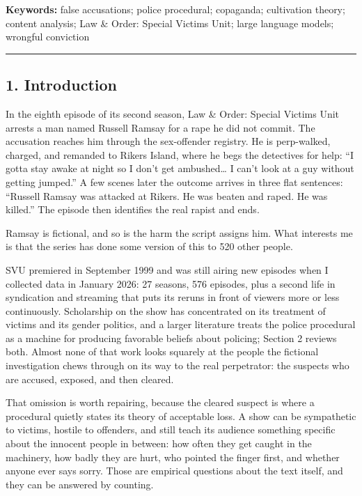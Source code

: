 \documentclass[
]{article}
\newcounter{none} %
\begin{document}
\textbf{Keywords:} false accusations; police procedural; copaganda;
cultivation theory; content analysis; Law \& Order: Special Victims
Unit; large language models; wrongful conviction

\begin{center}\rule{0.5\linewidth}{0.5pt}\end{center}

\subsection{1. Introduction}\label{introduction}

In the eighth episode of its second season, Law \& Order: Special
Victims Unit arrests a man named Russell Ramsay for a rape he did not
commit. The accusation reaches him through the sex-offender registry. He
is perp-walked, charged, and remanded to Rikers Island, where he begs
the detectives for help: ``I gotta stay awake at night so I don't get
ambushed\ldots{} I can't look at a guy without getting jumped.'' A few
scenes later the outcome arrives in three flat sentences: ``Russell
Ramsay was attacked at Rikers. He was beaten and raped. He was killed.''
The episode then identifies the real rapist and ends.

Ramsay is fictional, and so is the harm the script assigns him. What
interests me is that the series has done some version of this to 520
other people.

SVU premiered in September 1999 and was still airing new episodes when I
collected data in January 2026: 27 seasons, 576 episodes, plus a second
life in syndication and streaming that puts its reruns in front of
viewers more or less continuously. Scholarship on the show has
concentrated on its treatment of victims and its gender politics, and a
larger literature treats the police procedural as a machine for
producing favorable beliefs about policing; Section 2 reviews both.
Almost none of that work looks squarely at the people the fictional
investigation chews through on its way to the real perpetrator: the
suspects who are accused, exposed, and then cleared.

That omission is worth repairing, because the cleared suspect is where a
procedural quietly states its theory of acceptable loss. A show can be
sympathetic to victims, hostile to offenders, and still teach its
audience something specific about the innocent people in between: how
often they get caught in the machinery, how badly they are hurt, who
pointed the finger first, and whether anyone ever says sorry. Those are
empirical questions about the text itself, and they can be answered by
counting.
\end{document}
